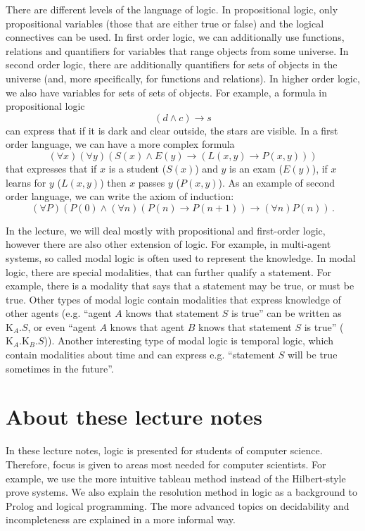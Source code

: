 There are different levels of the language of logic. In propositional logic, only propositional variables (those that are either true or false) and the logical connectives can be used. In first order logic, we can additionally use functions, relations and quantifiers for variables that range objects from some universe. In second order logic, there are additionally quantifiers for sets of objects in the universe (and, more specifically, for functions and relations). In higher order logic, we also have variables for sets of sets of objects. For example, a formula in propositional logic $$ (d \land c) \to s$$ can express that if it is dark and clear outside, the stars are visible. In a first order language, we can have a more complex formula $$ (\forall x)(\forall y)(S(x) \land E(y) \to (L(x,y) \to P(x, y)))$$ that expresses that if $x$ is a student ($S(x)$) and $y$ is an exam ($E(y)$), if $x$ learns for $y$ ($L(x,y)$) then $x$ passes $y$ ($P(x,y)$). As an example of second order language, we can write the axiom of induction: $$ (\forall P)(P(0) \land (\forall n)(P(n) \to P(n+1)) \to (\forall n)P(n))\,.$$

In the lecture, we will deal mostly with propositional and first-order logic, however there are also other extension of logic. For example, in multi-agent systems, so called modal logic is often used to represent the knowledge. In modal logic, there are special modalities, that can further qualify a statement. For example, there is a modality that says that a statement may be true, or must be true. Other types of modal logic contain modalities that express knowledge of other agents (e.g. ``agent $A$ knows that statement $S$ is true'' can be written as $\mathrm{K}_A.S$, or even ``agent $A$ knows that agent $B$ knows that statement $S$ is true'' ($\mathrm{K}_A.\mathrm{K}_B.S$)). Another interesting type of modal logic is temporal logic, which contain modalities about time and can express e.g. ``statement $S$ will be true sometimes in the future''.

\section{About these lecture notes}

In these lecture notes, logic is presented for students of computer science. Therefore, focus is given to areas most needed for computer scientists. For example, we use the more intuitive tableau method instead of the Hilbert-style prove systems. We also explain the resolution method in logic as a background to Prolog and logical programming. The more advanced topics on decidability and incompleteness are explained in a more informal way.

